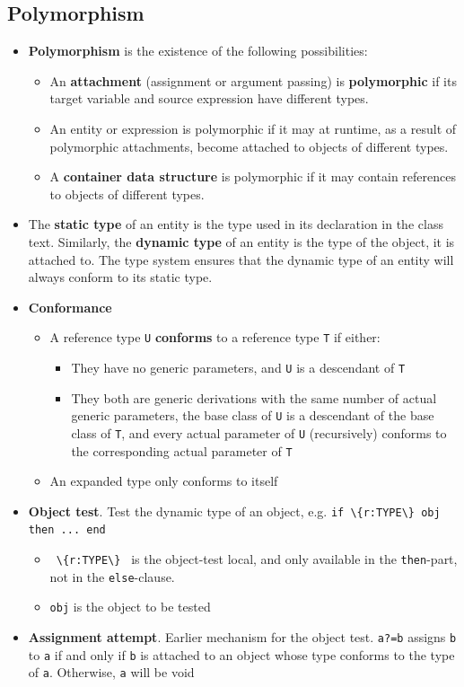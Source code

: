 \documentclass[a4paper]{article}
\newcommand{\inline}[1]{\lstinline!#1!}%
\begin{document}
\subsection{Polymorphism}
\begin{itemize}
\item \textbf{Polymorphism} is the existence of the following possibilities:
\begin{itemize}
\item An \textbf{attachment} (assignment or argument passing) is \textbf{polymorphic} if its target variable and source expression have different types.
\item An entity or expression is polymorphic if it may at runtime, as a result of polymorphic attachments, become attached to objects of different types. 
\item A \textbf{container data structure} is polymorphic if it may contain references to objects of different types.  
\end{itemize}
\item The \textbf{static type} of an entity is the type used in its declaration in the class text. Similarly, the \textbf{dynamic type} of an entity is the type of the object, it is attached to. The type system ensures that the dynamic type of an entity will always conform to its static type.
\item \textbf{Conformance}
\begin{itemize}
\item A reference type \inline{U} \textbf{conforms} to a reference type \inline{T} if either:
\begin{itemize}
\item They have no generic parameters, and \inline{U} is a descendant of \inline{T}
\item They both are generic derivations with the same number of actual generic parameters, the base class of \inline{U} is a descendant of the base class of \inline{T}, and every actual parameter of \inline{U} (recursively) conforms to the corresponding actual parameter of \inline{T}
\end{itemize}
\item An expanded type only conforms to itself
\end{itemize}
\item \textbf{Object test}. Test the dynamic type of an object, e.g. \inline{if \{r:TYPE\} obj then ... end}
\begin{itemize}
\item \inline{ \{r:TYPE\} } is the object-test local, and only available in the \inline{then}-part, not in the \inline{else}-clause.
\item \inline{obj} is the object to be tested
\end{itemize}
\item \textbf{Assignment attempt}. Earlier mechanism for the object test. \inline{a?=b} assigns \inline{b} to \inline{a} if and only if \inline{b} is attached to an object whose type conforms to the type of \inline{a}. Otherwise, \inline{a} will be void
\end{itemize}
\end{document}
